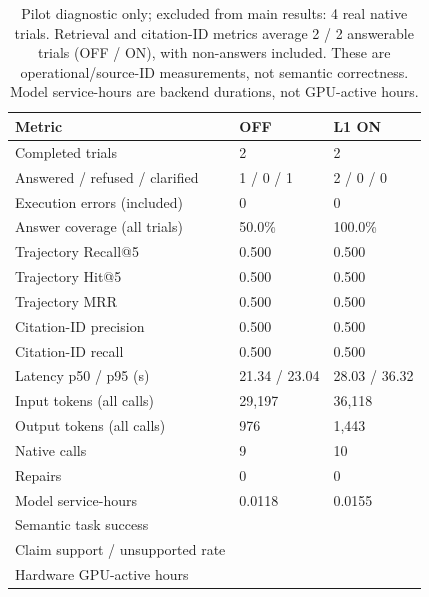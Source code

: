 \begin{table}[H]\centering\footnotesize
\begin{tabularx}{\textwidth}{@{}L{5.0cm}XX@{}}\toprule Metric & OFF & L1 ON\\\midrule
Completed trials & 2 & 2\\
Answered / refused / clarified & 1 / 0 / 1 & 2 / 0 / 0\\
Execution errors (included) & 0 & 0\\
Answer coverage (all trials) & 50.0\% & 100.0\%\\
Trajectory Recall@5 & 0.500 & 0.500\\
Trajectory Hit@5 & 0.500 & 0.500\\
Trajectory MRR & 0.500 & 0.500\\
Citation-ID precision & 0.500 & 0.500\\
Citation-ID recall & 0.500 & 0.500\\
Latency p50 / p95 (s) & 21.34 / 23.04 & 28.03 / 36.32\\
Input tokens (all calls) & 29,197 & 36,118\\
Output tokens (all calls) & 976 & 1,443\\
Native calls & 9 & 10\\
Repairs & 0 & 0\\
Model service-hours & 0.0118 & 0.0155\\
Semantic task success &  & \\
Claim support / unsupported rate &  & \\
Hardware GPU-active hours &  & \\
\bottomrule\end{tabularx}
\caption{Pilot diagnostic only; excluded from main results: 4 real native trials. Retrieval and citation-ID metrics average 2 / 2 answerable trials (OFF / ON), with non-answers included. These are operational/source-ID measurements, not semantic correctness. Model service-hours are backend durations, not GPU-active hours.}
\end{table}

